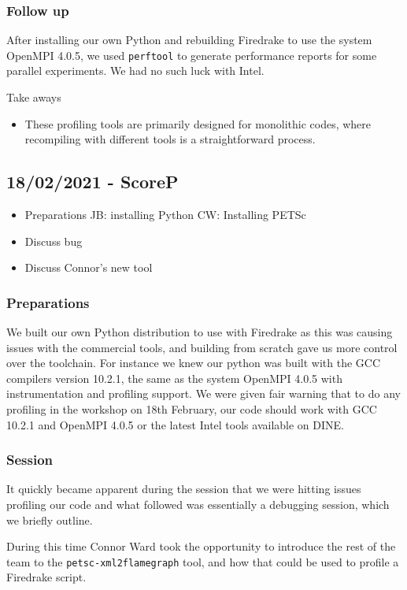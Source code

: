\documentclass[a4paper,11pt]{article}
\newenvironment{jacknotes}{\color{red}\renewcommand{\labelitemi}{$\star$}\begin{itemize}}{\end{itemize}}
\begin{document}
\subsubsection*{Follow up}
After installing our own Python and rebuilding Firedrake to use the system OpenMPI 4.0.5, we used \verb`perftool` to generate performance reports for some parallel experiments.
We had no such luck with Intel.

Take aways
\begin{itemize}
	\item These profiling tools are primarily designed for monolithic codes, where recompiling with different tools is a straightforward process.
\end{itemize}

\clearpage
\subsection{18/02/2021 - ScoreP}
\label{ssec:scorep}
\begin{jacknotes}
	\item Preparations JB: installing Python CW: Installing PETSc
	\item Discuss bug
	\item Discuss Connor's new tool
\end{jacknotes}
\subsubsection*{Preparations}
We built our own Python distribution to use with Firedrake as this was causing issues with the commercial tools, and building from scratch gave us more control over the toolchain.
For instance we knew our python was built with the GCC compilers version 10.2.1, the same as the system OpenMPI 4.0.5 with instrumentation and profiling support.
We were given fair warning that to do any profiling in the workshop on 18th February, our code should work with GCC 10.2.1 and OpenMPI 4.0.5 or the latest Intel tools available on DINE.


\subsubsection*{Session}
It quickly became apparent during the session that we were hitting issues profiling our code and what followed was essentially a debugging session, which we briefly outline.

During this time Connor Ward took the opportunity to introduce the rest of the team to the \verb`petsc-xml2flamegraph` tool, and how that could be used to profile a Firedrake script.
\end{document}
